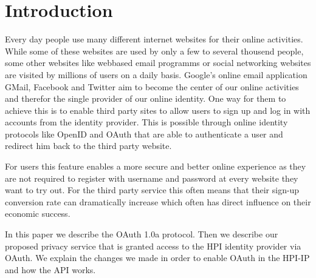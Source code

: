 \section{Introduction }
\label{sec:intro}

Every day people use many different internet websites for their online activities. While some of these websites are used by only a few to several thousend people, some other websites like webbased email programms or social networking websites are visited by millions of users on a daily basis. Google's online email application GMail, Facebook and Twitter aim to become the center of our online activities and therefor the single provider of our online identity. One way for them to achieve this is to enable third party sites to allow users to sign up and log in with accounts from the identity provider. This is possible through online identity protocols like OpenID and OAuth that are able to authenticate a user and redirect him back to the third party website.

For users this feature enables a more secure and better online experience as they are not required to register with username and password at every website they want to try out. For the third party service this often means that their sign-up conversion rate can dramatically increase which often has direct influence on their economic success.

In this paper we describe the OAuth 1.0a protocol. Then we describe our proposed privacy service that is granted access to the HPI identity provider via OAuth. We explain the changes we made in order to enable OAuth in the HPI-IP and how the API works.

